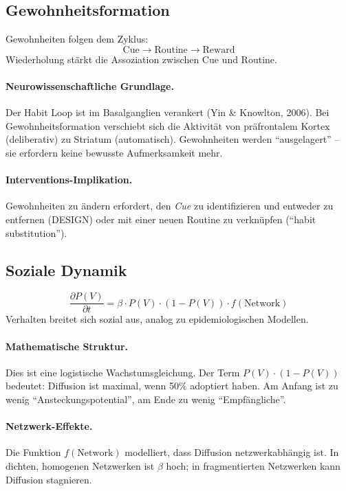 \subsection{Gewohnheitsformation}

\begin{axiom}
Gewohnheiten folgen dem Zyklus:
\begin{equation}
\text{Cue} \rightarrow \text{Routine} \rightarrow \text{Reward}
\end{equation}
Wiederholung stärkt die Assoziation zwischen Cue und Routine.

\paragraph{Neurowissenschaftliche Grundlage.}
Der Habit Loop ist im Basalganglien verankert (Yin \& Knowlton, 2006). Bei Gewohnheitsformation verschiebt sich die Aktivität von präfrontalem Kortex (deliberativ) zu Striatum (automatisch). Gewohnheiten werden ``ausgelagert'' -- sie erfordern keine bewusste Aufmerksamkeit mehr.

\paragraph{Interventions-Implikation.}
Gewohnheiten zu ändern erfordert, den \textit{Cue} zu identifizieren und entweder zu entfernen (DESIGN) oder mit einer neuen Routine zu verknüpfen (``habit substitution'').
\end{axiom}

\subsection{Soziale Dynamik}

\begin{axiom}
\begin{equation}
\frac{\partial P(V)}{\partial t} = \beta \cdot P(V) \cdot (1 - P(V)) \cdot f(\text{Network})
\end{equation}
Verhalten breitet sich sozial aus, analog zu epidemiologischen Modellen.

\paragraph{Mathematische Struktur.}
Dies ist eine logistische Wachstumsgleichung. Der Term $P(V) \cdot (1-P(V))$ bedeutet: Diffusion ist maximal, wenn 50\% adoptiert haben. Am Anfang ist zu wenig ``Ansteckungspotential'', am Ende zu wenig ``Empfängliche''.

\paragraph{Netzwerk-Effekte.}
Die Funktion $f(\text{Network})$ modelliert, dass Diffusion netzwerkabhängig ist. In dichten, homogenen Netzwerken ist $\beta$ hoch; in fragmentierten Netzwerken kann Diffusion stagnieren.
\end{axiom}


